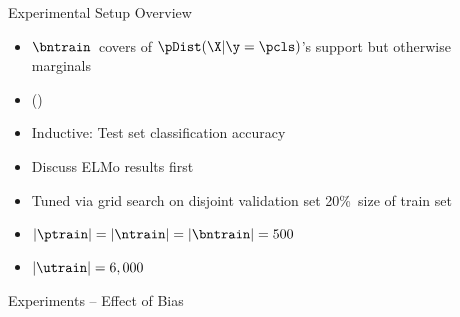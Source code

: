 \begin{frame}{Experimental Setup Overview}
  \begin{itemize}[<+->]
    \setlength{\itemsep}{6pt}
    \item $\bntrain$~covers  of ${\pDist(\X \vert \y = \pcls)}$'s support but otherwise marginals 
    \item () 
  \end{itemize}
  \vfill
  \begin{itemize}[<+->]
    \setlength{\itemsep}{6pt}
    \item Inductive: Test set classification accuracy
    \item Discuss ELMo results first 
  \end{itemize}
  \vfill
  \begin{itemize}[<+->]
    \setlength{\itemsep}{6pt}
    \item Tuned via grid search on disjoint validation set 20\%~size of train set
    \item ${\abs{\ptrain} = \abs{\ntrain} = \abs{\bntrain} = 500}$
    \item ${\abs{\utrain} = 6,000}$
  \end{itemize}
\end{frame}

\begin{frame}{Experiments -- Effect of Bias}
  
\end{frame}

